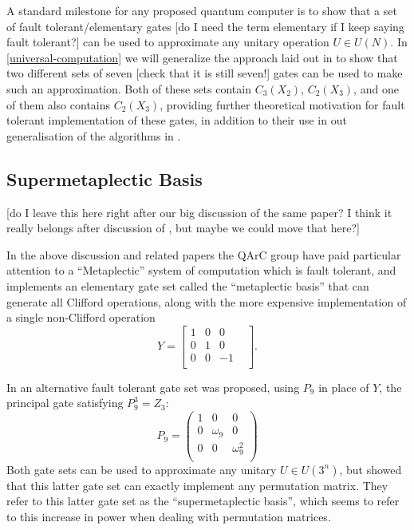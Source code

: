 A standard milestone for any proposed quantum computer is to show that a set of fault tolerant/elementary gates [do I need the term elementary if I keep saying fault tolerant?] can be used to approximate any unitary operation $U \in U(N)$. In \ref{universal-computation} we will generalize the approach laid out in \cite{universal-qubit} to show that two different sets of seven [check that it is still seven!] gates can be used to make such an approximation. Both of these sets contain $C_3(X_2)$, $C_2(X_3)$, and one of them also contains $C_2(X_3)$, providing further theoretical motivation for fault tolerant implementation of these gates, in addition to their use in out generalisation of the algorithms in \cite{arithmetics}.

\subsection{Supermetaplectic Basis}
[do I leave this here right after our big discussion of the same paper? I think it really belongs after discussion of \cite{pi-over-eight}, but maybe we could move that here?]

In the above discussion and related papers the QArC group have paid particular attention to a ``Metaplectic'' system of computation which is fault tolerant, and implements an elementary gate set called the ``metaplectic basis'' that can generate all Clifford operations, along with the more expensive implementation of a single non-Clifford operation
\[Y = \begin{bmatrix}
1 & 0 & 0 & \\
0 & 1 & 0 & \\
0 & 0 & -1 & \\
\end{bmatrix}.\]

In \cite{arithmetics} an alternative fault tolerant gate set was proposed, using $P_9$ in place of $Y$, the principal gate satisfying $P_9^3 = Z_3$:
\[P_9 = \begin{pmatrix}
1 & 0 & 0 \\
0 & \omega_9 & 0 \\
0 & 0 & \omega_9^2 \\
\end{pmatrix}\]
Both gate sets can be used to approximate any unitary $U \in U(3^n)$, but \cite{arithmetics} showed that this latter gate set can exactly implement any permutation matrix. They refer to this latter gate set as the ``supermetaplectic basis'', which seems to refer to this increase in power when dealing with permutation matrices.

